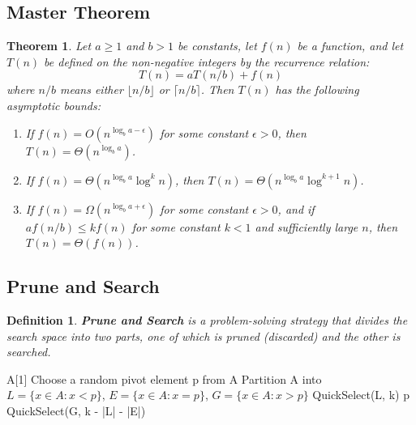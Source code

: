 \documentclass[11pt,fleqn]{article}
\newtheorem*{theorem}{Theorem}
\newtheorem*{definition}{Definition}
\begin{document}
\subsection{Master Theorem}
\begin{theorem}
    Let $a \geq 1$ and $b > 1$ be constants, let $f(n)$ be a function, and let $T(n)$ be defined on the non-negative integers by the recurrence relation: \[
        T(n) = aT(n/b) + f(n)
    \]
    where $n/b$ means either $\lfloor n/b \rfloor$ or $\lceil n/b \rceil$. Then $T(n)$ has the following asymptotic bounds: \begin{enumerate}
        \item If $f(n) = O(n^{\log_b a - \epsilon})$ for some constant $\epsilon > 0$, then $T(n) = \Theta(n^{\log_b a})$.
        \item If $f(n) = \Theta(n^{\log_b a} \log^k n)$, then $T(n) = \Theta(n^{\log_b a} \log^{k+1} n)$.
        \item If $f(n) = \Omega(n^{\log_b a + \epsilon})$ for some constant $\epsilon > 0$, and if $a f(n/b) \leq k f(n)$ for some constant $k < 1$ and sufficiently large $n$, then $T(n) = \Theta(f(n))$.
    \end{enumerate}
\end{theorem}

\subsection{Prune and Search}

\begin{definition}
    \textbf{Prune and Search} is a problem-solving strategy that divides the search space into two parts, one of which is pruned (discarded) and the other is searched.
\end{definition}

\begin{algorithmic}
     
        \State \Return A[1]
    \EndIf
    \State Choose a random pivot element p from A
    \State Partition A into $L = \{x \in A : x < p\}$, $E = \{x \in A : x = p\}$, $G = \{x \in A : x > p\}$
        \State \Return QuickSelect(L, k)
        \State \Return p
    \Else
        \State \Return QuickSelect(G, k - |L| - |E|)
    \EndIf
    \EndFunction
\end{algorithmic}
\end{document}
